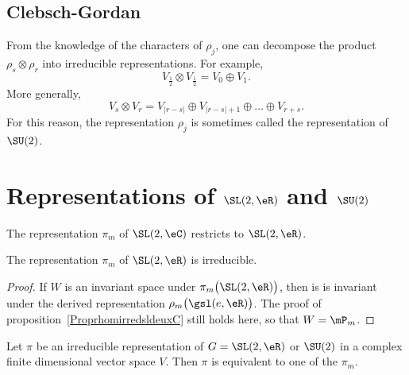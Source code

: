 \subsection{Clebsch-Gordan}

From the knowledge of the characters of $\rho_j$, one can decompose the product $\rho_s\otimes\rho_r$ into irreducible representations. For example,
\[
   V_{\frac{1}{2}}\otimes V_{\frac{1}{2}}=V_0\oplus V_1.
\]
More generally,
\begin{equation}
  V_s\otimes V_r=V_{|r-s|} \oplus V_{|r-s|+1}\oplus\ldots\oplus V_{r+s}.
\end{equation}
For this reason, the representation $\rho_j$ is sometimes called the  representation of $\SU(2)$.

					\section{Representations of \texorpdfstring{$\SL(2,\eR)$}{SL2R} and \texorpdfstring{$\SU(2)$}{SU2}}

The representation $\pi_m$ of $\SL(2,\eC)$ restricts to $\SL(2,\eR)$.

\begin{lemma}
The representation $\pi_m$ of $\SL(2,\eR)$ is irreducible.
\end{lemma}

\begin{proof}
If $W$ is an invariant space under $\pi_m\big( \SL(2,\eR) \big)$, then is is invariant under the derived representation $\rho_m\big( \gsl(e,\eR) \big)$. The proof of proposition~\ref{ProprhomirredsldeuxC} still holds here, so that $W=\mP_m$.
\end{proof}

\begin{theorem}
Let $\pi$ be an irreducible representation of $G=\SL(2,\eR)$ or $\SU(2)$ in a complex finite dimensional vector space $V$. Then $\pi$ is equivalent to one of the $\pi_m$.
\end{theorem}

